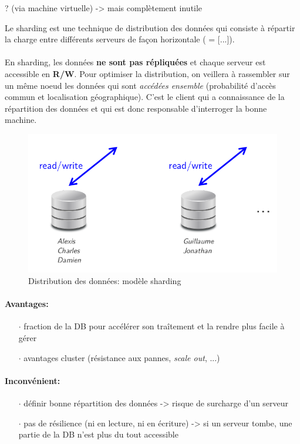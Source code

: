 \item{}
{\vrai ? (via machine virtuelle) -> mais complètement inutile}
{Le sharding est une technique de distribution des données qui consiste à répartir la charge entre différents serveurs de façon horizontale ( = [...]).
\paragraph{}
En sharding, les données \textbf{ne sont pas répliquées} et chaque serveur est accessible en \textbf{R/W}. Pour optimiser la distribution, on veillera à rassembler sur un même noeud les données qui sont \textit{accédées ensemble} (probabilité d'accès commun et localisation géographique). C'est le client qui a connaissance de la répartition des données et qui est donc responsable d'interroger la bonne machine.
\begin{figure}[!h]
\center\includegraphics[scale=.3]{images/sharding}
\caption{Distribution des données: modèle sharding \cite{ref1}}
\end{figure}

\paragraph{Avantages:}
\begin{itemize}
\item[$\cdot$]fraction de la DB pour accélérer son traîtement et la rendre plus facile à gérer
\item[$\cdot$]avantages cluster (résistance aux pannes, \textit{scale out}, ...)
\end{itemize}

\paragraph{Inconvénient:}
\begin{itemize}
\item[$\cdot$]définir bonne répartition des données -> risque de surcharge d'un serveur
\item[$\cdot$]pas de résilience (ni en lecture, ni en écriture) -> si un serveur tombe, une partie de la DB n'est plus du tout accessible
\end{itemize}

}


